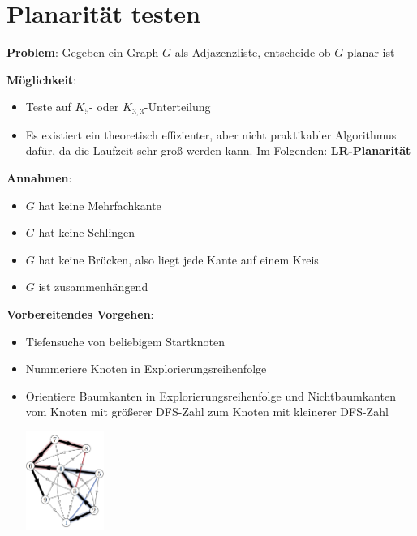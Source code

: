 \section{Planarität testen}

\textbf{Problem}: Gegeben ein Graph $G$ als Adjazenzliste, entscheide ob $G$ planar ist

\textbf{Möglichkeit}: 
\begin{itemize}
	\item Teste auf $K_5$- oder $K_{3,3}$-Unterteilung
	\item Es existiert ein theoretisch effizienter, aber nicht praktikabler Algorithmus dafür, da die Laufzeit sehr groß werden kann. Im Folgenden: \textbf{LR-Planarität}
\end{itemize}

\textbf{Annahmen}:
\begin{itemize}
	\item $G$ hat keine Mehrfachkante
	\item $G$ hat keine Schlingen
	\item $G$ hat keine Brücken, also liegt jede Kante auf einem Kreis
	\item $G$ ist zusammenhängend
\end{itemize}

\textbf{Vorbereitendes Vorgehen}:
\begin{itemize}
	\item Tiefensuche von beliebigem Startknoten
	\item Nummeriere Knoten in Explorierungsreihenfolge
	\item Orientiere Baumkanten in Explorierungsreihenfolge und Nichtbaumkanten vom Knoten mit größerer DFS-Zahl zum Knoten mit kleinerer DFS-Zahl
	\begin{center}
		\includegraphics[width=0.2\textwidth]{images/dfs.png}
	\end{center}
\end{itemize}

